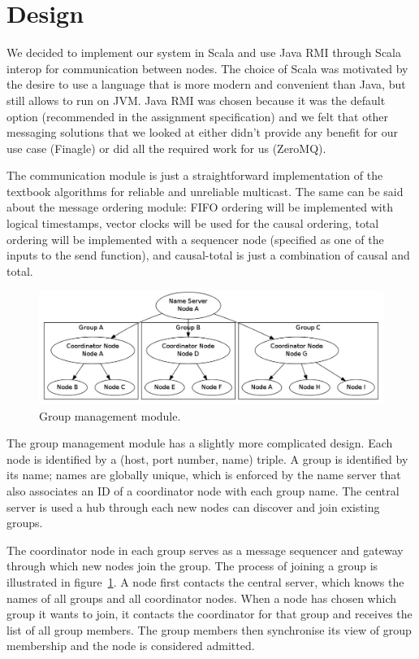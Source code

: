 \documentclass[10pt, oneside]{article}
\begin{document}
\section{Design}

We decided to implement our system in Scala and use Java RMI through Scala
interop for communication between nodes. The choice of Scala was motivated by
the desire to use a language that is more modern and convenient than Java, but
still allows to run on JVM. Java RMI was chosen because it was the default
option (recommended in the assignment specification) and we felt that other
messaging solutions that we looked at either didn't provide any benefit for our
use case (Finagle) or did all the required work for us (ZeroMQ).

The communication module is just a straightforward implementation of the
textbook algorithms for reliable and unreliable multicast\cite{Textbook}. The
same can be said about the message ordering module: FIFO ordering will be
implemented with logical timestamps, vector clocks will be used for the causal
ordering, total ordering will be implemented with a sequencer node (specified as
one of the inputs to the send function), and causal-total is just a combination
of causal and total.

\begin{figure}[h]
\centering
\includegraphics[width=12cm]{graph1}
\caption{Group management module.}
\label{fig:group}
\end{figure}

The group management module has a slightly more complicated design. Each node is
identified by a (host, port number, name) triple. A group is identified by its
name; names are globally unique, which is enforced by the name server that also
associates an ID of a coordinator node with each group name. The central server
is used a hub through each new nodes can discover and join existing groups.

The coordinator node in each group serves as a message sequencer and gateway
through which new nodes join the group. The process of joining a group is
illustrated in figure~\ref{fig:group}. A node first contacts the central server,
which knows the names of all groups and all coordinator nodes. When a node has
chosen which group it wants to join, it contacts the coordinator for that group
and receives the list of all group members. The group members then synchronise
its view of group membership and the node is considered admitted.
\end{document}
